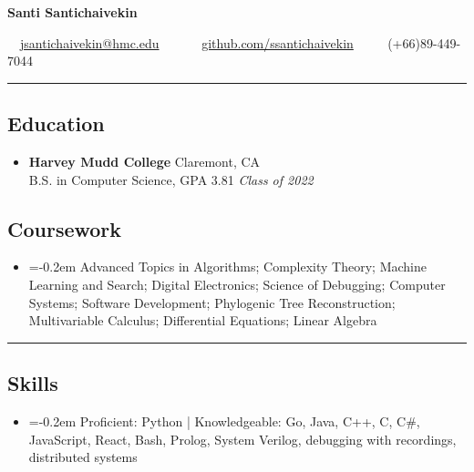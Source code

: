 \documentclass[10pt,letterpaper]{article}
\begin{document}
\fontsize{9.2}{11.5}\selectfont

\begin{center}
{\Large \textbf{Santi Santichaivekin}}

\ \ \href{mailto:jsantichaivekin@hmc.edu}{jsantichaivekin@hmc.edu}\ \ 
\ \ \textbullet
\ \ \href{https://github.com/ssantichaivekin}{github.com/ssantichaivekin}
\ \ \textbullet
\ \ (+66)89-449-7044

\end{center}


\hrule
\vspace{-0.95em}
\subsection*{Education}
  \begin{itemize}
    \parskip=-0.5em

    \item[]
    \textbf{Harvey Mudd College} \hfill
      Claremont, CA\\
    {B.S. in Computer Science, GPA 3.81
    \hfill \emph{Class of 2022}}
  \end{itemize}
  \vspace{-2.2em}
\subsection*{Coursework}
\begin{itemize}
\item[]
    \parskip=-0.2em
  Advanced Topics in Algorithms; 
  Complexity Theory;
  Machine Learning and Search; 
  Digital Electronics; 
  Science of Debugging;
  Computer Systems;
  Software Development;
  Phylogenic Tree Reconstruction;
  Multivariable Calculus;
  Differential Equations;
  Linear Algebra
  

\end{itemize}

\hrule
\vspace{-0.95em}
\subsection*{Skills}
\begin{itemize}
\item[]
    \parskip=-0.2em
  Proficient: Python | Knowledgeable: Go, Java, C++, C, C\#, JavaScript, React, Bash, Prolog, System Verilog, debugging with recordings,
  distributed systems
    
\end{itemize}
\end{document}
